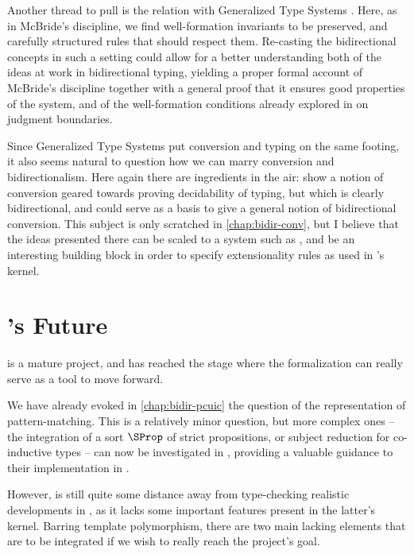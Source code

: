 Another thread to pull is the relation with Generalized Type Systems
. Here, as in McBride’s discipline, we find
well-formation invariants to be preserved,
and carefully structured rules that should respect them. Re-casting
the bidirectional concepts in such a setting could allow for a better understanding both of the
ideas at work in bidirectional typing,
yielding a proper formal account of McBride’s discipline
together with a general proof that it ensures
good properties of the system, and of the well-formation conditions already explored in
\textcite{Bauer2020} on judgment boundaries.

Since Generalized Type Systems put conversion and typing on the same footing,
it also seems natural
to question how we can marry conversion and bidirectionalism. Here again there are ingredients in
the air:  show a notion of conversion geared towards proving decidability
of typing, but which is clearly bidirectional, and could serve as a basis to give a general
notion of bidirectional conversion. This subject is only scratched in \cref{chap:bidir-conv}, but
I believe that the ideas presented there can be scaled to a system such as , and
be an interesting building block in order to specify extensionality rules as used in ’s
kernel.

\section{’s Future}

 is a mature project, and has reached the stage
where the formalization can really
serve as a tool to move  forward.

We have already evoked in \cref{chap:bidir-pcuic} the question of the representation of pattern-matching.
This is a relatively minor question, but more complex ones – \eg{}
the integration of a sort $\SProp$ of strict propositions, or subject reduction for
co-inductive types –
can now be investigated in , providing a valuable guidance
to their implementation in .

However,  is still quite some distance away from type-checking realistic developments
in , as it lacks some important features present in the latter’s kernel. Barring
template polymorphism,%
there are two main lacking elements that are to be integrated if we wish to really reach the
project’s goal.

